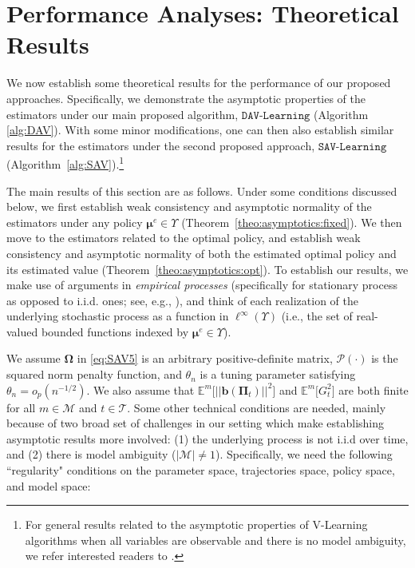 \documentclass[opre,nonblindrev]{informs2}%
\newcommand{\1}{\hbox{\rm 1\kern-.35em 1}}
\newcommand{\E}{\mathbb E}
\newcommand{\MT}{\mathscr T}
\newcommand{\MM}{\mathscr M}
\newcommand{\bPi}{\boldsymbol{\Pi}}
\newcommand{\bmu}{\boldsymbol{\mu}}
\newcommand{\bOmega}{\boldsymbol{\Omega}}
\newcommand{\bb}{\mathbf{b}}
\newcommand{\SAV}{\texttt{SAV-Learning}}
\newcommand{\DAV}{\texttt{DAV-Learning}}
\begin{document}
\section{Performance Analyses: Theoretical Results}\label{sec:assymptotics}
We now establish some theoretical results for the performance of our proposed approaches. Specifically, we demonstrate the asymptotic properties of the estimators under our  main proposed algorithm, $\DAV$ (Algorithm \ref{alg:DAV}). With some minor modifications, one can then also establish similar results for the estimators under the second proposed approach, $\SAV$ (Algorithm~\ref{alg:SAV}).\footnote{For general results related to the asymptotic properties of V-Learning algorithms when all variables are observable and there is no model ambiguity, we refer interested readers to \cite{Luckett2020}.}


The main results of this section are as follows. Under some conditions discussed below, we first establish  weak consistency and asymptotic normality of the estimators under any policy  $\bmu^e\in\Upsilon$ (Theorem~\ref{theo:asymptotics:fixed}). We then move to the estimators related to the optimal policy, and  establish weak consistency and asymptotic normality of both the estimated optimal policy and its estimated value (Theorem~\ref{theo:asymptotics:opt}). To establish our results, we make use of arguments in {\em empirical processes} (specifically for stationary process as opposed to i.i.d. ones; see, e.g., \cite{Dedecker2002, Kosorok2008}), and think of each realization of the underlying stochastic process as a function in $\ell^\infty(\Upsilon)$ (i.e., the set of real-valued bounded functions indexed by $\bmu^e\in\Upsilon$).

We assume $\bOmega$ in \eqref{eq:SAV5} is an arbitrary  positive-definite matrix, $\mathcal P (\cdot)$ is the squared norm penalty function, and $\theta_n$ is a tuning parameter satisfying $\theta_n=o_p(n^{-1/2})$. We also assume that $\E^m\big[||\bb(\bPi_t)||^2\big]$ and $\E^m \big[G_t^2\big]$ are both finite for all $m\in\MM$ and $t\in\MT$.   Some other technical conditions are needed, mainly because of two broad set of challenges in our setting which make establishing asymptotic results more involved:  (1) the underlying process is not i.i.d over time, and (2) there is model ambiguity ($|\MM|\neq 1$).  Specifically,  we need the following ``regularity" conditions on the parameter space, trajectories space, policy space, and model space:
\end{document}
